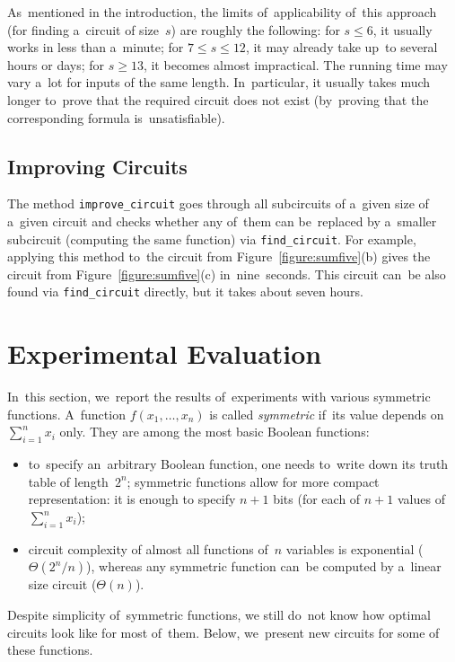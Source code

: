 \documentclass[12pt,letterpaper]{article}
\begin{document}
As~mentioned in the introduction, the limits 
of~applicability of~this approach (for finding a~circuit of size~$s$) are roughly the following:
for $s \le 6$, it usually works in less than a~minute;
for $7 \le s \le 12$, it may already take up~to 
several hours or days; for $s \ge 13$, it becomes almost impractical. The running time may vary a~lot
for inputs of the same length. In~particular,
it usually takes much longer to~prove that 
the required circuit does not exist (by~proving that the corresponding formula is~unsatisfiable).


\subsection{Improving Circuits}
The method \texttt{improve_circuit}
goes through all subcircuits of a~given size
of a~given circuit and checks whether any 
of~them can be~replaced by a~smaller subcircuit 
(computing the same function) via \texttt{find_circuit}. For example, applying this method 
to~the circuit from Figure~\ref{figure:sumfive}(b)
gives the circuit from Figure~\ref{figure:sumfive}(c)
in~nine~seconds. This circuit can~be also found via \texttt{find_circuit} directly, but it takes about seven hours.





\section{Experimental Evaluation}
In~this section, we~report the results of~experiments
with various symmetric functions. A~function $f(x_1,\dotsc,x_n)$ is called \emph{symmetric} if~its value depends on~$\sum_{i=1}^nx_i$ only. They are among the most basic Boolean functions:
\begin{itemize}
\item to~specify an~arbitrary Boolean function, one needs
to~write down its truth table of length~$2^n$; symmetric functions allow for more compact representation: it is enough to specify $n+1$ bits (for each of $n+1$ values 
of~$\sum_{i=1}^nx_i$);
\item circuit complexity of almost all functions 
of~$n$ variables is exponential ($\Theta(2^n/n)$), whereas any symmetric function can~be computed by a~linear size circuit ($\Theta(n)$). 
\end{itemize}
Despite simplicity of~symmetric functions, we still do~not
know how optimal circuits look like for most of~them. Below, we~present new circuits for some of these functions.
\end{document}
